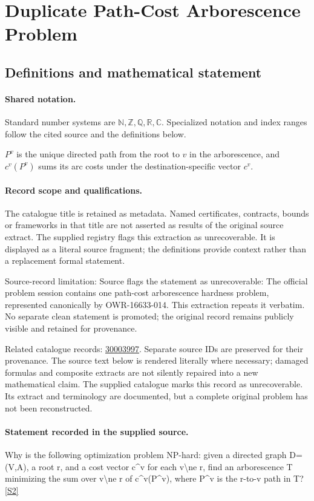 \documentclass[11pt]{article}
\newcommand{\sref}[2]{\hyperlink{source:#1:#2}{[S#2]}}
\begin{document}
\section{Duplicate Path-Cost Arborescence Problem}\label{statement}

\subsection{Definitions and mathematical statement}

\paragraph{Shared notation.}Standard number systems are $\mathbb N,\mathbb Z,\mathbb Q,\mathbb R,\mathbb C$. Specialized notation and index ranges follow the cited source and the definitions below.


$P^v$ is the unique directed path from the root to $v$ in the arborescence, and $c^v(P^v)$ sums its arc costs under the destination-specific vector $c^v$.
\paragraph{Record scope and qualifications.}
The catalogue title is retained as metadata. Named certificates, contracts, bounds or frameworks in that title are not asserted as results of the original source extract.
The supplied registry flags this extraction as unrecoverable. It is displayed as a literal source fragment; the definitions provide context rather than a replacement formal statement.

Source-record limitation: Source flags the statement as unrecoverable: The official problem session contains one path-cost arborescence hardness problem, represented canonically by OWR-16633-014. This extraction repeats it verbatim. No separate clean statement is promoted; the original record remains publicly visible and retained for provenance.

Related catalogue records: \href{https://mehmetmars7.github.io/Erdosproblems-llm-hunter/problem.html?type=open_problems&id=30003997}{30003997}. Separate source IDs are preserved for their provenance.
The source text below is rendered literally where necessary; damaged formulas and composite extracts are not silently repaired into a new mathematical claim.
The supplied catalogue marks this record as unrecoverable. Its extract and terminology are documented, but a complete original problem has not been reconstructed.
\paragraph{Statement recorded in the supplied source.}
Why is the following optimization problem NP-hard: given a directed graph D=(V,A), a root r, and a cost vector c\textasciicircum{}v for each v\textbackslash{}ne r, find an arborescence T minimizing the sum over v\textbackslash{}ne r of c\textasciicircum{}v(P\textasciicircum{}v), where P\textasciicircum{}v is the r-to-v path in T? \sref{statement}{2}
\end{document}
